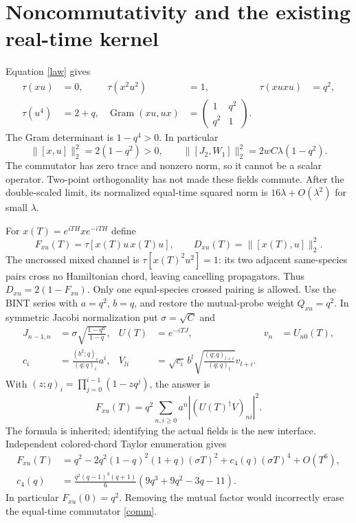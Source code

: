 \documentclass[11pt]{article}
\begin{document}
\section{Noncommutativity and the existing real-time kernel}
Equation \eqref{law} gives
\begin{align}
 \tau(xu)&=0,&\tau(x^2u^2)&=1,&\tau(xuxu)&=q^2,\\
 \tau(u^4)&=2+q,&
 \operatorname{Gram}(xu,ux)&=
       \begin{pmatrix}1&q^2\\q^2&1\end{pmatrix}.
\end{align}
The Gram determinant is $1-q^4>0$. In particular
\begin{equation}
 \boxed{\|[x,u]\|_2^2=2(1-q^2)>0,\qquad
 \|[J_2,W_1]\|_2^2=2wC\lambda(1-q^2).}\label{comm}
\end{equation}
The commutator has zero trace and nonzero norm, so it cannot be a
scalar operator. Two-point orthogonality has not made these fields
commute. After the double-scaled limit, its normalized equal-time
squared norm is $16\lambda+O(\lambda^2)$ for small $\lambda$.

For $x(T)=e^{iTH}xe^{-iTH}$ define
\begin{equation}
 F_{xu}(T)=\tau[x(T)u\,x(T)u],\qquad
 D_{xu}(T)=\|[x(T),u]\|_2^2.
\end{equation}
The uncrossed mixed channel is $\tau[x(T)^2u^2]=1$: its two adjacent
same-species pairs cross no Hamiltonian chord, leaving cancelling
propagators. Thus $D_{xu}=2(1-F_{xu})$. Only one equal-species crossed
pairing is allowed. Use the BINT series \cite{BINT} with
$a=q^2$, $b=q$, and restore the mutual-probe weight $Q_{xu}=q^2$.
In symmetric Jacobi normalization put $\sigma=\sqrt C$ and
\begin{align}
 J_{n-1,n}&=\sigma\sqrt{\frac{1-q^n}{1-q}},&
 U(T)&=e^{-iTJ},&v_n&=U_{n0}(T),\\
 c_i&=\frac{(b^2;q)_i}{(q;q)_i}a^i,&
 V_{li}&=\sqrt{c_i}\,b^l
       \sqrt{\frac{(q;q)_{l+i}}{(q;q)_l}}v_{l+i}.
\end{align}
With $(z;q)_i=\prod_{j=0}^{i-1}(1-zq^j)$, the answer is
\begin{equation}
 \boxed{F_{xu}(T)=q^2\sum_{n,i\ge0}a^n
                 |(U(T)^\dagger V)_{ni}|^2.}\label{otoc}
\end{equation}
The formula is inherited; identifying the actual fields is the new
interface. Independent colored-chord Taylor enumeration gives
\begin{align}
 F_{xu}(T)&=q^2-2q^2(1-q)^2(1+q)(\sigma T)^2
                  +c_4(q)(\sigma T)^4+O(T^6),\\
 c_4(q)&=\frac{q^2(q-1)^3(q+1)}6
                     (9q^3+9q^2-3q-11).
\end{align}
In particular $F_{xu}(0)=q^2$. Removing the mutual factor would
incorrectly erase the equal-time commutator \eqref{comm}.
\end{document}
